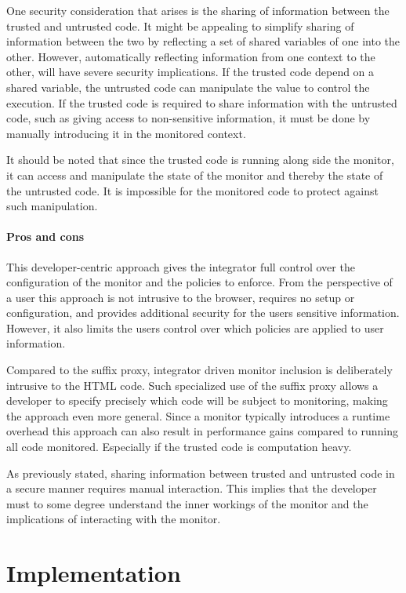 \documentclass{llncs}
\begin{document}
One security consideration that arises is the sharing of information between the 
trusted and untrusted code. It might be appealing to simplify sharing of 
information between the two by reflecting a set of shared variables of one into the other.
However, automatically 
reflecting information from one context to the other, will 
have severe security implications. If the trusted code depend on a 
shared variable, the untrusted code can manipulate the value to control the
execution.
If the trusted code is required to share information 
with the untrusted code, such as giving access to non-sensitive information, it 
must be done by manually introducing it in the monitored context.

It should be noted that since the trusted code is running along side the monitor, 
it can access and manipulate the state of the monitor and thereby the state of 
the untrusted code. It is impossible for the monitored code to protect against 
such manipulation.

\paragraph{Pros and cons}

This developer-centric approach gives the integrator full control over the 
configuration of the monitor and the policies to enforce. From the perspective of a user this 
approach is not intrusive to the browser, requires no setup or configuration, 
and provides additional security for the users sensitive information. However, 
it also limits the users control over which policies are applied to user information. 

Compared to the suffix proxy, integrator driven monitor 
inclusion is deliberately intrusive to the HTML code. Such specialized use of the suffix 
proxy allows a developer to specify precisely which code will be subject to 
monitoring, making the approach even more general. 
Since a monitor typically introduces a runtime overhead this approach can also 
result in performance gains compared to running all code monitored. Especially 
if the trusted code is computation heavy.

As previously stated, sharing information 
between trusted and untrusted code in a secure manner requires manual interaction. 
This implies that the developer must to some degree understand the inner workings of the monitor
and the implications of interacting with the monitor.


\section{Implementation}
\label{sec:impl}
\end{document}
